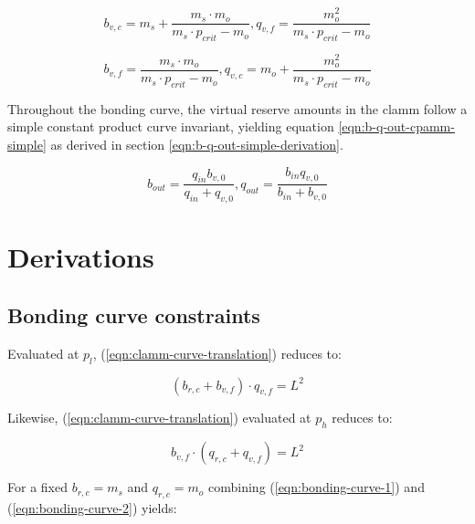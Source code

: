 \documentclass[table, twocolumn]{article}
\begin{document}
\begin{equation} \label{eqn:bonding-curve-setup}
  b_{v, c} = m_s + \frac{m_s \cdot m_o}{m_s \cdot p_{crit} - m_o},
  q_{v, f} = \frac{m_o ^ 2}{m_s \cdot p_{crit} - m_o}
\end{equation}

\begin{equation} \label{eqn:bonding-curve-transition}
  b_{v, f} = \frac{m_s \cdot m_o}{m_s \cdot p_{crit} - m_o},
  q_{v, c} = m_o + \frac{m_o ^ 2}{m_s \cdot p_{crit} - m_o}
\end{equation}

Throughout the bonding curve, the virtual reserve amounts in the \gls{clamm} follow a
simple constant product curve invariant, yielding equation
\ref{eqn:b-q-out-cpamm-simple} as derived in section
\ref{eqn:b-q-out-simple-derivation}.

\begin{equation} \label{eqn:b-q-out-cpamm-simple}
  b_{out} = \frac{q_{in} b_{v, 0}}{q_{in} + q_{v, 0}},
  q_{out} = \frac{b_{in} q_{v, 0}}{b_{in} + b_{v, 0}}
\end{equation}

\section{Derivations}

\subsection{Bonding curve constraints} \label{sec:bonding-curve-constraints}

Evaluated at $p_l$, (\ref{eqn:clamm-curve-translation}) reduces to:

\begin{equation} \label{eqn:bonding-curve-1}
  (b_{r, c} + b_{v, f}) \cdot q_{v, f} = L^2
\end{equation}

Likewise, (\ref{eqn:clamm-curve-translation}) evaluated at $p_h$ reduces to:

\begin{equation} \label{eqn:bonding-curve-2}
  b_{v, f} \cdot (q_{r, c} + q_{v, f}) = L^2
\end{equation}

For a fixed $b_{r, c} = m_s$ and $q_{r, c} = m_o$ combining (\ref{eqn:bonding-curve-1})
and (\ref{eqn:bonding-curve-2}) yields:
\end{document}
